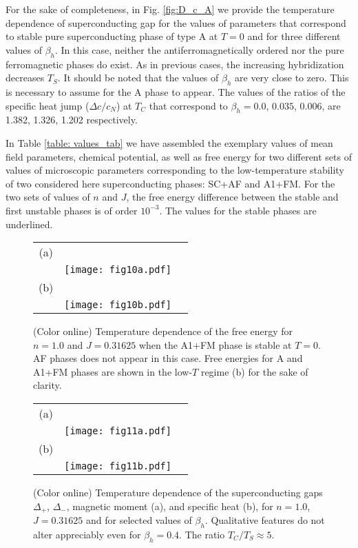\documentclass[aps,prb,showpacs,reprint]{revtex4-1}
\begin{document}
For the sake of completeness, in Fig. \ref{fig:D_c_A}  we provide the temperature
dependence of superconducting gap for the values of parameters that
correspond to 
stable pure superconducting phase of type A at $T=0$ and for three different values of $\beta_h$. In this case, neither the
antiferromagnetically ordered nor the pure ferromagnetic phases
do exist.
As in previous cases, the increasing hybridization decreases $T_S$. It
should be noted that the
values of $\beta_h$ are very close to zero. This is necessary to assume for the
A phase to appear. The values of the ratios of the
specific heat jump ($\Delta c/c_N$) at $T_C$ that correspond to $\beta_h=0.0$,
$0.035$, $0.006$, are 1.382, 1.326, 1.202 respectively.

In Table \ref{table: values_tab} we have assembled the exemplary values of mean field
parameters, chemical potential, as well as free energy for two
different sets of values of microscopic parameters corresponding to the
low-temperature stability of two
considered here superconducting phases: SC+AF and A1+FM. For the two sets of values
of $n$ and $J$, the free energy difference between the stable and first unstable phases is of order $10^{-3}$. The values for
the stable phases are underlined.

\begin{figure}[htpb]
\centering
\begin{tabular}{ccc}
  (a) & & \quad \quad \quad \quad \quad\\
      & \texttt{[image: fig10a.pdf]} & \\
  (b) & & \quad \quad \quad \quad \quad\\
      & \texttt{[image: fig10b.pdf]} &\\
\end{tabular}
\caption{(Color online) Temperature dependence of the free energy for
$n=1.0$ and $J=0.31625$ when the A1+FM phase is stable at $T=0$. AF
phases does not appear in this case. Free energies for A and A1+FM phases
are shown in
the low-$T$ regime (b) for the sake of clarity.}
\label{fig:fe_A1FM}
\end{figure}

\begin{figure}[htpb]
\centering
\begin{tabular}{ccc}
  (a) & & \quad \quad \quad \quad \quad\\
      & \texttt{[image: fig11a.pdf]} & \\
  (b) & & \quad \quad \quad \quad \quad\\
      & \texttt{[image: fig11b.pdf]} &\\
\end{tabular}
\caption{(Color online) Temperature dependence of the superconducting gaps
$\Delta_+$, $\Delta_-$, magnetic moment (a), and specific heat (b),
for $n=1.0$, $J=0.31625$ and for selected values of $\beta_h$. Qualitative features
do not alter appreciably
even
for $\beta_h=0.4$. The ratio $T_C/T_S\approx 5$.}
\label{fig:D_S_A1FM}
\end{figure}
\end{document}

